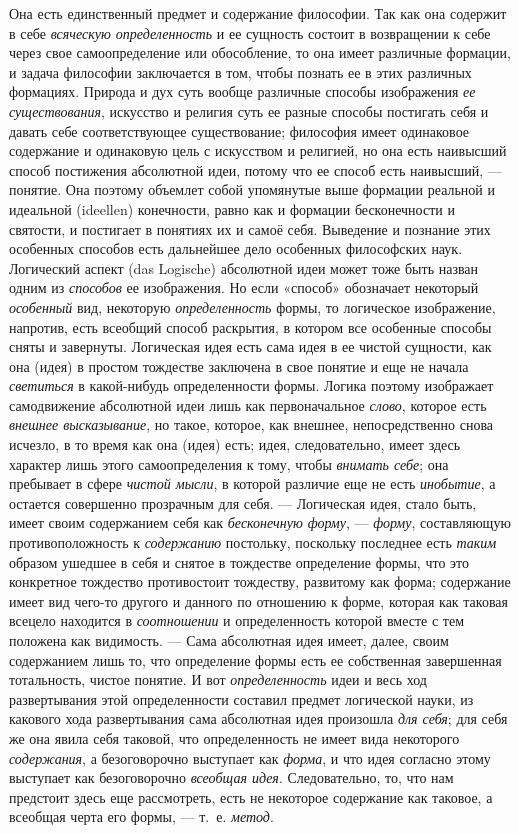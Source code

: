 \documentclass[twoside]{article}
\begin{document}
Она есть единственный предмет и содержание философии. Так как
она содержит в себе {\em всяческую
определенность} и ее сущность состоит в возвращении к себе
через свое самоопределение или обособление, то она имеет различные
формации, и задача философии заключается в том, чтобы познать ее в этих
различных формациях. Природа и дух суть вообще различные способы
изображения {\em ее существования},
искусство и религия суть ее разные способы постигать себя и
давать себе соответствующее существование; философия имеет одинаковое
содержание и одинаковую цель с искусством и религией, но она
есть наивысший способ постижения абсолютной идеи, потому что ее способ есть
наивысший, — понятие. Она поэтому объемлет собой упомянутые
выше формации реальной и идеальной (ideellen) конечности,
равно как и формации бесконечности и святости, и постигает в понятиях их и
самоё себя. Выведение и познание этих особенных способов есть дальнейшее
дело особенных философских наук. Логический аспект (das Logische)
абсолютной идеи может тоже быть назван одним из
{\em способов} ее
изображения. Но если «способ» обозначает некоторый
{\em особенный} вид,
некоторую {\em определенность}
формы, то логическое изображение, напротив, есть всеобщий
способ раскрытия, в котором все особенные способы сняты и завернуты.
Логическая идея есть сама идея в ее чистой сущности, как она (идея) в
простом тождестве заключена в свое понятие и еще не начала
{\em светиться} в
какой-нибудь определенности формы. Логика поэтому изображает самодвижение
абсолютной идеи лишь как первоначальное
{\em слово}, которое есть
{\em внешнее высказывание},
но такое, которое, как внешнее, непосредственно снова
исчезло, в то время как она (идея) есть; идея, следовательно, имеет здесь
характер лишь этого самоопределения к тому, чтобы
{\em внимать себе}; она
пребывает в сфере {\em чистой мысли},
в которой различие еще не есть
{\em инобытие}, а
остается совершенно прозрачным для себя. — Логическая идея,
стало быть, имеет своим содержанием себя как
{\em бесконечную форму}, —
{\em форму}, составляющую
противоположность к {\em содержанию}
постольку, поскольку последнее есть
{\em таким} образом
ушедшее в себя и снятое в тождестве определение формы, что это конкретное
тождество противостоит тождеству, развитому как форма; содержание имеет вид
чего-то другого и данного по отношению к форме, которая как таковая всецело
находится в {\em соотношении}
и определенность которой вместе с тем положена как
видимость. — Сама абсолютная идея имеет, далее, своим
содержанием лишь то, что определение формы есть ее собственная завершенная
тотальность, чистое понятие. И вот
{\em определенность} идеи
и весь ход развертывания этой определенности составил предмет логической
науки, из какового хода развертывания сама абсолютная идея произошла
{\em для себя}; для себя
же она явила себя таковой, что определенность не имеет вида некоторого
{\em содержания}, а
безоговорочно выступает как
{\em форма}, и что идея
согласно этому выступает как безоговорочно
{\em всеобщая идея}.
Следовательно, то, что нам предстоит здесь еще рассмотреть,
есть не некоторое содержание как таковое, а всеобщая черта его формы, —
т.~е. {\em метод}.
\end{document}
